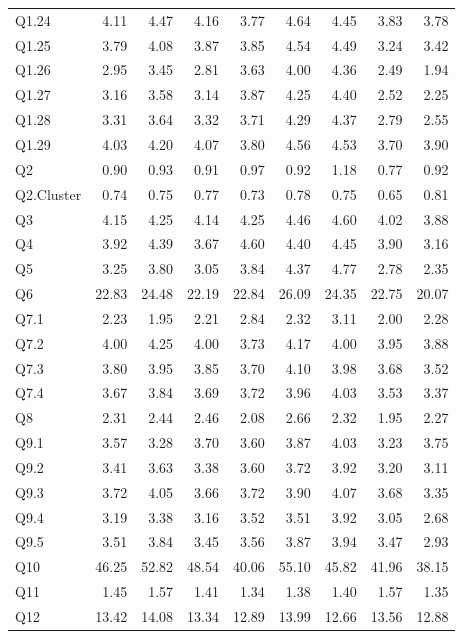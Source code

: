 \documentclass[
]{article}
\begin{document}
\begin{center}
\begin{longtable}{lrrrrrrrr}
Q1.24 & 4.11 & 4.47 & 4.16 & 3.77 & 4.64 & 4.45 & 3.83 & 3.78\\
Q1.25 & 3.79 & 4.08 & 3.87 & 3.85 & 4.54 & 4.49 & 3.24 & 3.42\\
\addlinespace
Q1.26 & 2.95 & 3.45 & 2.81 & 3.63 & 4.00 & 4.36 & 2.49 & 1.94\\
Q1.27 & 3.16 & 3.58 & 3.14 & 3.87 & 4.25 & 4.40 & 2.52 & 2.25\\
Q1.28 & 3.31 & 3.64 & 3.32 & 3.71 & 4.29 & 4.37 & 2.79 & 2.55\\
Q1.29 & 4.03 & 4.20 & 4.07 & 3.80 & 4.56 & 4.53 & 3.70 & 3.90\\
Q2 & 0.90 & 0.93 & 0.91 & 0.97 & 0.92 & 1.18 & 0.77 & 0.92\\
\addlinespace
Q2.Cluster & 0.74 & 0.75 & 0.77 & 0.73 & 0.78 & 0.75 & 0.65 & 0.81\\
Q3 & 4.15 & 4.25 & 4.14 & 4.25 & 4.46 & 4.60 & 4.02 & 3.88\\
Q4 & 3.92 & 4.39 & 3.67 & 4.60 & 4.40 & 4.45 & 3.90 & 3.16\\
Q5 & 3.25 & 3.80 & 3.05 & 3.84 & 4.37 & 4.77 & 2.78 & 2.35\\
Q6 & 22.83 & 24.48 & 22.19 & 22.84 & 26.09 & 24.35 & 22.75 & 20.07\\
\addlinespace
Q7.1 & 2.23 & 1.95 & 2.21 & 2.84 & 2.32 & 3.11 & 2.00 & 2.28\\
Q7.2 & 4.00 & 4.25 & 4.00 & 3.73 & 4.17 & 4.00 & 3.95 & 3.88\\
Q7.3 & 3.80 & 3.95 & 3.85 & 3.70 & 4.10 & 3.98 & 3.68 & 3.52\\
Q7.4 & 3.67 & 3.84 & 3.69 & 3.72 & 3.96 & 4.03 & 3.53 & 3.37\\
Q8 & 2.31 & 2.44 & 2.46 & 2.08 & 2.66 & 2.32 & 1.95 & 2.27\\
\addlinespace
Q9.1 & 3.57 & 3.28 & 3.70 & 3.60 & 3.87 & 4.03 & 3.23 & 3.75\\
Q9.2 & 3.41 & 3.63 & 3.38 & 3.60 & 3.72 & 3.92 & 3.20 & 3.11\\
Q9.3 & 3.72 & 4.05 & 3.66 & 3.72 & 3.90 & 4.07 & 3.68 & 3.35\\
Q9.4 & 3.19 & 3.38 & 3.16 & 3.52 & 3.51 & 3.92 & 3.05 & 2.68\\
Q9.5 & 3.51 & 3.84 & 3.45 & 3.56 & 3.87 & 3.94 & 3.47 & 2.93\\
\addlinespace
Q10 & 46.25 & 52.82 & 48.54 & 40.06 & 55.10 & 45.82 & 41.96 & 38.15\\
Q11 & 1.45 & 1.57 & 1.41 & 1.34 & 1.38 & 1.40 & 1.57 & 1.35\\
Q12 & 13.42 & 14.08 & 13.34 & 12.89 & 13.99 & 12.66 & 13.56 & 12.88\\

\end{longtable}
\end{center}
\end{document}
